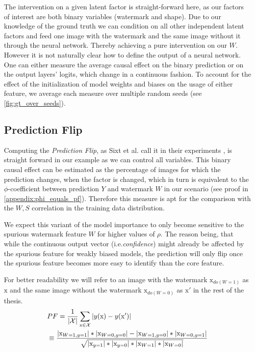 The intervention on a given latent factor is straight-forward here, as our factors of interest are both binary variables (watermark and shape). Due to our knowledge of the ground truth we can condition on all other independent latent factors and feed one image with the watermark and the same image without it through the neural network. Thereby achieving a pure intervention on our $W$.  
However it is not naturally clear how to define the output of a neural network. One can either measure the average causal effect on the binary prediction or on the output layers' logits, which change in a continuous fashion.
To account for the effect of the initialization of model weights and biases on the usage of either feature, we average each measure over multiple random seeds (see \cref{fig:gt_over_seeds}).

\subsection{Prediction Flip}
Computing the \textit{Prediction Flip}, as Sixt et al. call it in their experiments \cite{Sixt2022a}, is straight forward in our example as we can control all variables. 
This binary causal effect can be estimated as the percentage of images for which the prediction changes, when the factor is changed, which in turn is equivalent to the $\phi$-coefficient between prediction $Y$ and watermark $W$ in our scenario (see proof in \cref{appendix:phi_equals_pf}). Therefore this measure is apt for the comparison with the $W,S$ correlation in the training data distribution.

We expect this variant of the model importance to only become sensitive to the spurious watermark feature $W$ for higher values of $\rho$. The reason being, that while the continuous output vector (i.e.\textit{confidence}) might already be affected by the spurious feature for weakly biased models, the prediction will only flip once the spurious feature becomes more easy to identify than the core feature. 

For better readability we will refer to an image with the watermark $\mathrm{x}_{do(W=1)}$ as $\mathrm{x}$ and the same image without the watermark $\mathrm{x}_{do(W=0)}$ as $\mathrm{x'}$ in the rest of the thesis.
\begin{align}
\displaystyle 
& PF =\frac{1}{|\mathcal{X}|} \sum_{\mathrm{x} \in \mathcal{X}} |y(\mathrm{x}) - y(\mathrm{x'}) | \\
&  \equiv \frac{|\mathrm{x}_{W=1,y=1}|*|\mathrm{x}_{W=0,y=0}| - |\mathrm{x}_{W=1,y=0}|*|\mathrm{x}_{W=0,y=1}| }
{\sqrt{|\mathrm{x}_{y=1}|*|\mathrm{x}_{y=0}|*|\mathrm{x}_{W=1}|*|\mathrm{x}_{W=0}| }}
\end{align}


